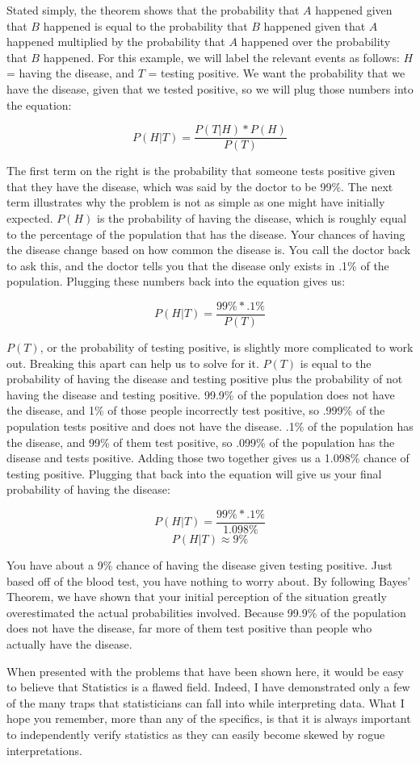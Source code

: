 Stated simply, the theorem shows that the probability that \(A\) happened given that \(B\) happened is equal to the probability that \(B\) happened given that \(A\) happened multiplied by the probability that \(A\) happened over the probability that \(B\) happened. For this example, we will label the relevant events as follows: \(H\) = having the disease, and \(T\) = testing positive. We want the probability that we have the disease, given that we tested positive, so we will plug those numbers into the equation:

\[P(H|T) = \frac{P(T|H) * P(H)}{P(T)}\]

The first term on the right is the probability that someone tests positive given that they have the disease, which was said by the doctor to be 99\%. The next term illustrates why the problem is not as simple as one might have initially expected. \(P(H)\) is the probability of having the disease, which is roughly equal to the percentage of the population that has the disease. Your chances of having the disease change based on how common the disease is. You call the doctor back to ask this, and the doctor tells you that the disease only exists in .1\% of the population. Plugging these numbers back into the equation gives us:

\[P(H|T) = \frac{99\% * .1\%}{P(T)}\]

\(P(T)\), or the probability of testing positive, is slightly more complicated to work out. Breaking this apart can help us to solve for it. \(P(T)\) is equal to the probability of having the disease and testing positive plus the probability of not having the disease and testing positive. 99.9\% of the population does not have the disease, and 1\% of those people incorrectly test positive, so .999\% of the population tests positive and does not have the disease. .1\% of the population has the disease, and 99\% of them test positive, so .099\% of the population has the disease and tests positive. Adding those two together gives us a 1.098\% chance of testing positive. Plugging that back into the equation will give us your final probability of having the disease:

\[P(H|T) = \frac{99\% * .1\%}{1.098\%}\]
\[P(H|T) \approx 9\% \]

You have about a 9\% chance of having the disease given testing positive. Just based off of the blood test, you have nothing to worry about. By following Bayes’ Theorem, we have shown that your initial perception of the situation greatly overestimated the actual probabilities involved. Because 99.9\% of the population does not have the disease, far more of them test positive than people who actually have the disease.

When presented with the problems that have been shown here, it would be easy to believe that Statistics is a flawed field. Indeed, I have demonstrated only a few of the many traps that statisticians can fall into while interpreting data. What I hope you remember, more than any of the specifics, is that it is always important to independently verify statistics as they can easily become skewed by rogue interpretations.
